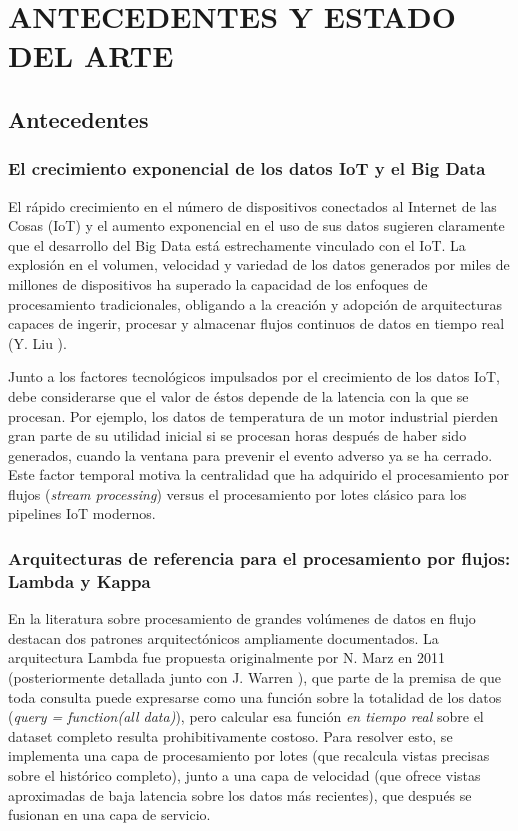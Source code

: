 \chapter{ANTECEDENTES Y ESTADO DEL \mbox{ARTE}}

\section{Antecedentes}

\subsection{El crecimiento exponencial de los datos IoT y el Big Data}

El rápido crecimiento en el número de dispositivos conectados al Internet de las Cosas (IoT) y el aumento exponencial en el uso de sus datos sugieren claramente que el desarrollo del Big Data está estrechamente vinculado con el IoT. La explosión en el volumen, velocidad y variedad de los datos generados por miles de millones de dispositivos ha superado la capacidad de los enfoques de procesamiento tradicionales, obligando a la creación y adopción de arquitecturas capaces de ingerir, procesar y almacenar flujos continuos de datos en tiempo real (Y. Liu \cite{liu2025}).

Junto a los factores tecnológicos impulsados por el crecimiento de los datos IoT, debe considerarse que el valor de éstos depende de la latencia con la que se procesan. Por ejemplo, los datos de temperatura de un motor industrial pierden gran parte de su utilidad inicial si se procesan horas después de haber sido generados, cuando la ventana para prevenir el evento adverso ya se ha cerrado. Este factor temporal motiva la centralidad que ha adquirido el procesamiento por flujos (\textit{stream processing}) versus el procesamiento por lotes clásico para los pipelines IoT modernos.

\subsection{Arquitecturas de referencia para el procesamiento por flujos: Lambda y Kappa}

En la literatura sobre procesamiento de grandes volúmenes de datos en flujo destacan dos patrones arquitectónicos ampliamente documentados. La arquitectura Lambda fue propuesta originalmente por N. Marz \cite{marz2011} en 2011 (posteriormente detallada junto con J. Warren \cite{marzwarren2015}), que parte de la premisa de que toda consulta puede expresarse como una función sobre la totalidad de los datos (\textit{query = function(all data)}), pero calcular esa función \textit{en tiempo real} sobre el dataset completo resulta prohibitivamente costoso. Para resolver esto, se implementa una capa de procesamiento por lotes (que recalcula vistas precisas sobre el histórico completo), junto a una capa de velocidad (que ofrece vistas aproximadas de baja latencia sobre los datos más recientes), que después se fusionan en una capa de servicio.

